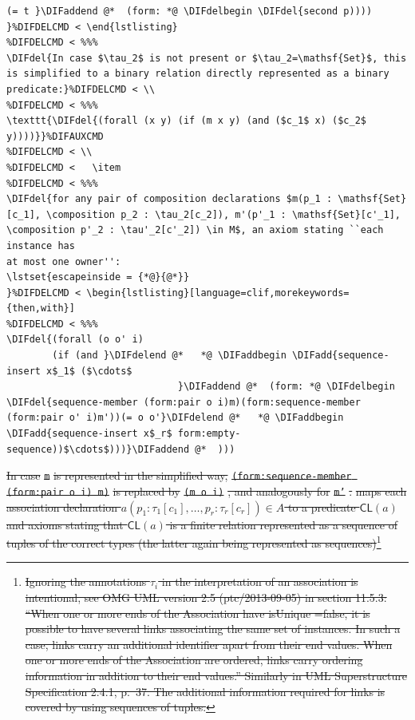 \documentclass[10pt,fleqn,final]{scrreprt}
\newcommand*{\CL}{\ensuremath{\mathsf{CL}}\xspace}
\newenvironment{definitions}[0]{\medskip }{}
\newcommand{\composition}{\raisebox{0.2pt}{\begin{sideways}\fontsize{6pt}{6pt}\selectfont$\blacklozenge$\end{sideways}}}
\providecommand{\DIFadd}[1]{{\protect\color{blue}\uwave{#1}}} %
\providecommand{\DIFdel}[1]{{\protect\color{red}\sout{#1}}}                      %
\providecommand{\DIFaddbegin}{} %
\providecommand{\DIFaddend}{} %
\providecommand{\DIFdelbegin}{} %
\providecommand{\DIFdelend}{} %
\begin{document}
\begin{definitions}
\begin{itemize}[topsep=0pt, label=--, leftmargin=*]
\begin{lstlisting}[language=clif, mathescape]
                         (= t }\DIFaddend @*  (form: *@ \DIFdelbegin \DIFdel{second p))))
}%DIFDELCMD < \end{lstlisting}
\DIFdel{In case $\tau_2$ is not present or $\tau_2=\mathsf{Set}$, this is simplified to a binary relation directly represented as a binary predicate:}%
\texttt{\DIFdel{(forall (x y) (if (m x y) (and ($c_1$ x) ($c_2$ y))))}}%
\DIFdel{for any pair of composition declarations $m(p_1 : \mathsf{Set}[c_1], \composition p_2 : \tau_2[c_2]), m'(p'_1 : \mathsf{Set}[c'_1], \composition p'_2 : \tau'_2[c'_2]) \in M$, an axiom stating ``each instance has
at most one owner'':
\lstset{escapeinside = {*@}{@*}}
}%
\DIFdel{(forall (o o' i)
        (if (and }\DIFdelend @*   *@ \DIFaddbegin \DIFadd{sequence-insert x$_1$ ($\cdots$
                              }\DIFaddend @*  (form: *@ \DIFdelbegin \DIFdel{sequence-member (form:pair o i)m)(form:sequence-member (form:pair o' i)m'))(= o o'}\DIFdelend @*   *@ \DIFaddbegin \DIFadd{sequence-insert x$_r$ form:empty-sequence))$\cdots$)))}\DIFaddend @*  )))
\end{lstlisting}
\DIFdelbegin \DIFdel{In case }\texttt{\DIFdel{m}} %
\DIFdel{is represented in the simplified way, }\texttt{\DIFdel{(form:sequence-member (form:pair o i) m)}} %
\DIFdel{is replaced by }\texttt{\DIFdel{(m o i)}}%
\DIFdel{, and analogously for }\texttt{\DIFdel{m'}}%
\DIFdel{.
  }%
\DIFdel{maps each association declaration $a(p_1 : \tau_1[c_1], \ldots, p_r : \tau_r[c_r])\in A$ to a predicate $\CL(a)$ and axioms stating that $\CL(a)$ is a finite relation represented as a sequence of tuples of the correct types (the latter again
being represented as sequences)}\footnote{\DIFdel{Ignoring the annotations $\tau_i$ in the interpretation of an association is intentional, see OMG UML version 2.5 (ptc/2013-09-05) in section 11.5.3: ``When one or more ends of the Association have isUnique =false, it is possible to have several links associating the same set of
instances. In such a case, links carry an additional identifier apart from their end values.
When one or more ends of the Association are ordered, links carry ordering information in addition to their end values.'' Similarly in UML Superstructure Specification 2.4.1, p.~37.  The additional information required for links is covered by using sequences of tuples.}}%

\end{itemize}
\end{definitions}
\end{document}
